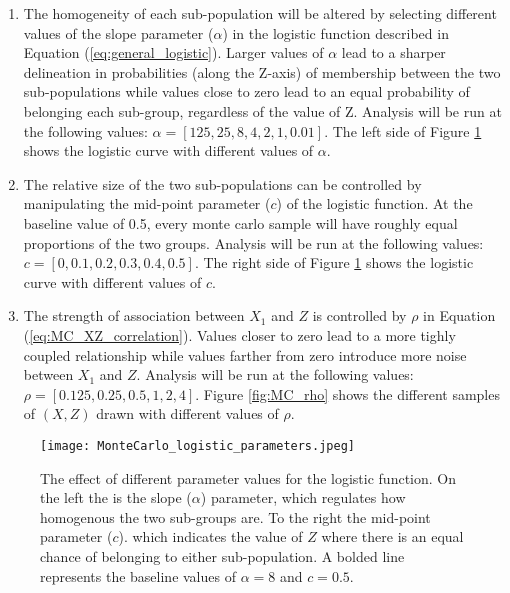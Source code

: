 \documentclass[12pt]{article}
\theoremstyle{definition}
\begin{document}
\begin{enumerate}
    \item The homogeneity of each sub-population will be altered by selecting different values of the slope parameter ($\alpha$) in the logistic function described in Equation (\ref{eq:general_logistic}). Larger values of $\alpha$ lead to a sharper delineation in probabilities (along the Z-axis) of membership between the two sub-populations while values close to zero lead to an equal probability of belonging each sub-group, regardless of the value of Z. Analysis will be run at the following values: $\alpha = [125, 25, 8, 4, 2, 1, 0.01]$. The left side of Figure \ref{fig:MC_logistic_pars} shows the logistic curve with different values of $\alpha$.
    
    \item The relative size of the two sub-populations can be controlled by manipulating the mid-point parameter ($c$) of the logistic function. At the baseline value of 0.5, every monte carlo sample will have roughly equal proportions of the two groups. Analysis will be run at the following values: $c = [0, 0.1, 0.2, 0.3, 0.4, 0.5]$. The right side of Figure \ref{fig:MC_logistic_pars} shows the logistic curve with different values of $c$.
  
    \item The strength of association between $X_{1}$ and $Z$ is controlled by $\rho$ in Equation (\ref{eq:MC_XZ_correlation}). Values closer to zero lead to a more tighly coupled relationship while values farther from zero introduce more noise between $X_{1}$ and $Z$. Analysis will be run at the following values: $\rho = [0.125, 0.25, 0.5, 1, 2, 4]$. Figure \ref{fig:MC_rho} shows the different samples of $(X, Z)$ drawn with different values of $\rho$.
\end{enumerate}


\begin{figure}[!ht]
  \centering
  \texttt{[image: MonteCarlo\_logistic\_parameters.jpeg]}
  \caption{The effect of different parameter values for the logistic function. On the left the is the slope ($\alpha$) parameter, which regulates how homogenous the two sub-groups are. To the right the mid-point parameter ($c$). which indicates the value of $Z$ where there is an equal chance of belonging to either sub-population. A bolded line represents the baseline values of $\alpha = 8$ and $c = 0.5$.}
  \label{fig:MC_logistic_pars}
\end{figure}
\end{document}
